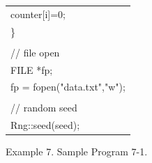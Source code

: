{\begin{center}
\begin{tabular}{|l|}
\hspace*{20mm}counter[i]=0;\\
\hspace*{10mm}\}\\
\\
\hspace*{10mm}// file open\\
\hspace*{10mm}FILE *fp;\\
\hspace*{10mm}fp = fopen("data.txt","w");\\
\\
\hspace*{10mm}// random seed\\
\hspace*{10mm}Rng::seed(seed);\\\hline
\end{tabular}
\vspace*{5mm}

{\small
Example 7. Sample Program 7-1.
}
\end{center}
}

\clearpage

